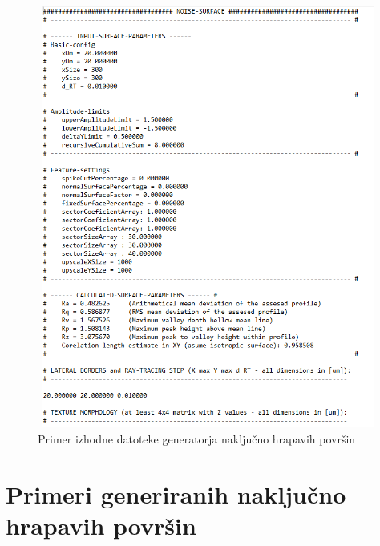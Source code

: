\documentclass[a4paper,twoside,openright,12pt,slovene]{book}
\begin{document}
\begin{figure}[H]
    \vspace{-15pt}
    \centering
    \includegraphics[width=130mm, height=139mm, trim={0 17 15 1}, clip]{Slike/vhodna datoteka.png}
    \caption{Primer izhodne datoteke generatorja naključno hrapavih površin}
    \label{fig:my_label}
\end{figure}

\clearpage

\section{Primeri generiranih naključno hrapavih površin}
\end{document}
